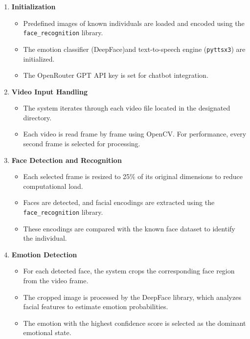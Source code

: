 \begin{enumerate}
    \item \textbf{Initialization}
    \begin{itemize}
        \item Predefined images of known individuals are loaded and encoded using the \texttt{face\_recognition} library.
        \item The emotion classifier (DeepFace)and text-to-speech engine (\texttt{pyttsx3}) are initialized.
        \item The OpenRouter GPT API key is set for chatbot integration.
    \end{itemize}

    \item \textbf{Video Input Handling}
    \begin{itemize}
        \item The system iterates through each video file located in the designated directory.
        \item Each video is read frame by frame using OpenCV. For performance, every second frame is selected for processing.
    \end{itemize}

    \item \textbf{Face Detection and Recognition}
    \begin{itemize}
        \item Each selected frame is resized to 25\% of its original dimensions to reduce computational load.
        \item Faces are detected, and facial encodings are extracted using the \texttt{face\_recognition} library.
        \item These encodings are compared with the known face dataset to identify the individual.
    \end{itemize}

    \item \textbf{Emotion Detection}
    \begin{itemize}
      
    \item For each detected face, the system crops the corresponding face region from the video frame.
    \item The cropped image is processed by the DeepFace library, which analyzes facial features to estimate emotion probabilities.
    \item The emotion with the highest confidence score is selected as the dominant emotional state.
\end{itemize}



\end{enumerate}
